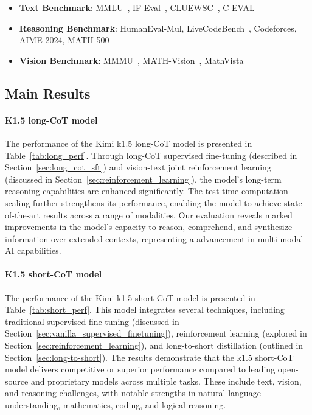 \documentclass{article}
\newcommand{\citep}[1]{\parencite{#1}}
\begin{document}
\begin{itemize}
    \item \textbf{Text Benchmark}: MMLU~\citep{Hendrycks2020MeasuringMM}, IF-Eval~\citep{Zhou2023InstructionFollowingEF}, CLUEWSC~\citep{Xu2020CLUEAC}, C-EVAL~\citep{Huang2023CEvalAM} 
    \item \textbf{Reasoning Benchmark}:
    HumanEval-Mul, LiveCodeBench~\citep{Jain2024LiveCodeBenchHA}, Codeforces, AIME 2024, MATH-500~\citep{lightman2023lets}
    \item \textbf{Vision Benchmark}:
    MMMU~\citep{yue2024mmmu}, MATH-Vision~\citep{wang2024measuring}, MathVista~\citep{lu2023mathvista}
\end{itemize}

\subsection{Main Results}

\paragraph{K1.5 long-CoT model}

The performance of the Kimi k1.5 long-CoT model is presented in Table~\ref{tab:long_perf}. Through long-CoT supervised fine-tuning (described in Section~\ref{sec:long_cot_sft}) and vision-text joint reinforcement learning (discussed in Section~\ref{sec:reinforcement_learning}), the model's long-term reasoning capabilities are enhanced significantly. The test-time computation scaling further strengthens its performance, enabling the model to achieve state-of-the-art results across a range of modalities. Our evaluation reveals marked improvements in the model's capacity to reason, comprehend, and synthesize information over extended contexts, representing a advancement in multi-modal AI capabilities.

\paragraph{K1.5 short-CoT model}

The performance of the Kimi k1.5 short-CoT model is presented in Table~\ref{tab:short_perf}. This model integrates several techniques, including traditional supervised fine-tuning (discussed in Section~\ref{sec:vanilla_supervised_finetuning}), reinforcement learning (explored in Section~\ref{sec:reinforcement_learning}), and long-to-short distillation (outlined in Section~\ref{sec:long-to-short}). The results demonstrate that the k1.5 short-CoT model delivers competitive or superior performance compared to leading open-source and proprietary models across multiple tasks. These include text, vision, and reasoning challenges, with notable strengths in natural language understanding, mathematics, coding, and logical reasoning.
\end{document}
